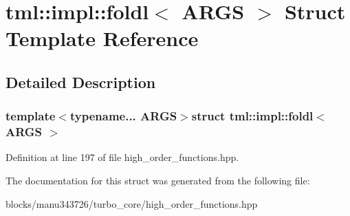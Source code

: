 \hypertarget{structtml_1_1impl_1_1foldl}{\section{tml\+:\+:impl\+:\+:foldl$<$ A\+R\+G\+S $>$ Struct Template Reference}
\label{structtml_1_1impl_1_1foldl}
}


\subsection{Detailed Description}
\subsubsection*{template$<$typename... A\+R\+G\+S$>$struct tml\+::impl\+::foldl$<$ A\+R\+G\+S $>$}



Definition at line 197 of file high\+\_\+order\+\_\+functions.\+hpp.



The documentation for this struct was generated from the following file\+:\begin{DoxyCompactItemize}
\item 
blocks/manu343726/turbo\+\_\+core/high\+\_\+order\+\_\+functions.\+hpp\end{DoxyCompactItemize}
